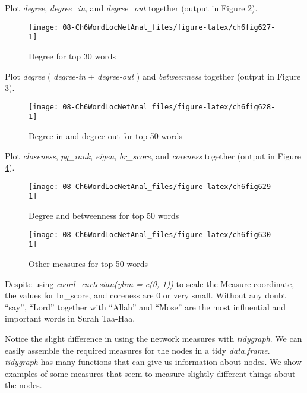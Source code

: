 \documentclass[
]{article}
\begin{document}
Plot \emph{degree}, \emph{degree\_in}, and \emph{degree\_out} together (output in Figure \ref{fig:ch6fig628}).

\begin{figure}

{\centering \texttt{[image: 08-Ch6WordLocNetAnal\_files/figure-latex/ch6fig627-1]} 

}

\caption{Degree for top 30 words}\label{fig:ch6fig627}
\end{figure}

Plot \emph{degree} ( \emph{degree-in} + \emph{degree-out} ) and \emph{betweenness} together (output in Figure \ref{fig:ch6fig629}).

\begin{figure}

{\centering \texttt{[image: 08-Ch6WordLocNetAnal\_files/figure-latex/ch6fig628-1]} 

}

\caption{Degree-in and degree-out for top 50 words}\label{fig:ch6fig628}
\end{figure}

Plot \emph{closeness}, \emph{pg\_rank}, \emph{eigen}, \emph{br\_score}, and \emph{coreness} together (output in Figure \ref{fig:ch6fig630}).

\begin{figure}

{\centering \texttt{[image: 08-Ch6WordLocNetAnal\_files/figure-latex/ch6fig629-1]} 

}

\caption{Degree and betweenness for top 50 words}\label{fig:ch6fig629}
\end{figure}

\begin{figure}

{\centering \texttt{[image: 08-Ch6WordLocNetAnal\_files/figure-latex/ch6fig630-1]} 

}

\caption{Other measures for top 50 words}\label{fig:ch6fig630}
\end{figure}

Despite using \emph{coord\_cartesian(ylim = c(0, 1))} to scale the Measure coordinate, the values for br\_score, and coreness are 0 or very small. Without any doubt ``say'', ``Lord'' together with ``Allah'' and ``Mose'' are the most influential and important words in Surah Taa-Haa.

Notice the slight difference in using the network measures with \emph{tidygraph}. We can easily assemble the required measures for the nodes in a tidy \emph{data.frame}. \emph{tidygraph} has many functions that can give us information about nodes. We show examples of some measures that seem to measure slightly different things about the nodes.
\end{document}
